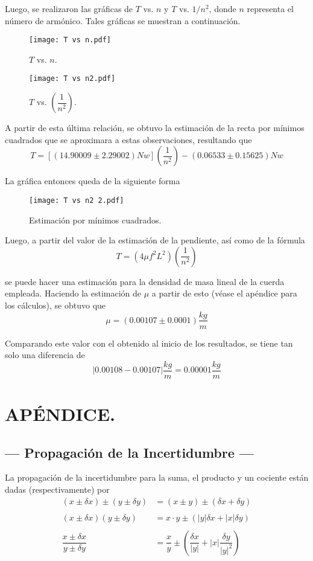 \documentclass[a4paper, 10pt]{article}
\begin{document}
 	Luego, se realizaron las gráficas de $ T $ vs. $ n $ y $ T $ vs. $ 1/n^2 $, donde $ n $ representa el número de armónico. Tales gráficas se muestran a continuación.

 	\begin{figure}[ht]
 		\centering
 		\texttt{[image: T vs n.pdf]}
 		\caption{$T$ vs. \(n\).}
 		\label{fig:graf1}
 	\end{figure}
 
 	\begin{figure}[ht]
 		\centering
 		\texttt{[image: T vs n2.pdf]}
 		\caption{$T$ vs. $ \left(\dfrac{1}{n^2}\right) $.}
 		\label{fig:graf2}
 	\end{figure}
 	\newpage
 	A partir de esta última relación, se obtuvo la estimación de la recta por mínimos cuadrados que se aproximara a estas observaciones, resultando que
 	$$ T=[(14.90009\pm 2.29002) Nw]\left(\dfrac{1}{n^2}\right)-(0.06533\pm 0.15625) Nw $$ 
 	
 	La gráfica entonces queda de la siguiente forma
 	
 	\begin{figure}[ht]
 		\centering
 		\texttt{[image: T vs n2 2.pdf]}
 		\caption{Estimación por mínimos cuadrados.}
 		\label{fig:graf3}
 	\end{figure}
 	\newpage
 	Luego, a partir del valor de la estimación de la pendiente, así como de la fórmula 
 	$$T=\left(4\mu f^2 L^2\right)\left(\dfrac{1}{n^2}\right)$$
 	
 	se puede hacer una estimación para la densidad de masa lineal de la cuerda empleada. Haciendo la estimación de $ \mu $ a partir de esto (véase el apéndice para los cálculos), se obtuvo que 
 	$$\mu=(0.00107\pm0.0001)\dfrac{kg}{m}$$
 	
 	Comparando este valor con el obtenido al inicio de los resultados, se tiene tan solo una diferencia de 
 	$$|0.00108-0.00107|\dfrac{kg}{m}=0.00001\dfrac{kg}{m}$$
	\newpage
	
	\section{APÉNDICE.}
	
	\subsection{--- Propagación de la Incertidumbre ---}
	
	La propagación de la incertidumbre para la suma, el producto y un cociente están dadas (respectivamente) por
	\begin{align*}
		(x\pm \delta x)\pm(y\pm \delta y)&=(x\pm y)\pm(\delta x+\delta y)\\\\
		(x\pm\delta x)(y\pm\delta y)&=x\cdot y\pm\left(|y|\delta x+|x|\delta y \right)\\\\
		\dfrac{x\pm\delta x}{y\pm\delta y}&=\dfrac{x}{y}\pm\left(\dfrac{\delta x}{|y|}+|x|\dfrac{\delta y}{|y|^2}\right)
	\end{align*}
	
\end{document}
